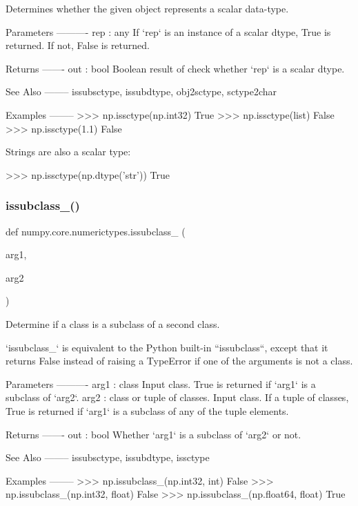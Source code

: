 \begin{DoxyVerb}Determines whether the given object represents a scalar data-type.

Parameters
----------
rep : any
    If `rep` is an instance of a scalar dtype, True is returned. If not,
    False is returned.

Returns
-------
out : bool
    Boolean result of check whether `rep` is a scalar dtype.

See Also
--------
issubsctype, issubdtype, obj2sctype, sctype2char

Examples
--------
>>> np.issctype(np.int32)
True
>>> np.issctype(list)
False
>>> np.issctype(1.1)
False

Strings are also a scalar type:

>>> np.issctype(np.dtype('str'))
True\end{DoxyVerb}
 \mbox{\label{namespacenumpy_1_1core_1_1numerictypes_aabfb2145123e09bd184960c3f238b9db}} 
\subsubsection{\texorpdfstring{issubclass\+\_\+()}{issubclass\_()}}
{\footnotesize\ttfamily def numpy.\+core.\+numerictypes.\+issubclass\+\_\+ (\begin{DoxyParamCaption}\item[{}]{arg1,  }\item[{}]{arg2 }\end{DoxyParamCaption})}

\begin{DoxyVerb}Determine if a class is a subclass of a second class.

`issubclass_` is equivalent to the Python built-in ``issubclass``,
except that it returns False instead of raising a TypeError if one
of the arguments is not a class.

Parameters
----------
arg1 : class
    Input class. True is returned if `arg1` is a subclass of `arg2`.
arg2 : class or tuple of classes.
    Input class. If a tuple of classes, True is returned if `arg1` is a
    subclass of any of the tuple elements.

Returns
-------
out : bool
    Whether `arg1` is a subclass of `arg2` or not.

See Also
--------
issubsctype, issubdtype, issctype

Examples
--------
>>> np.issubclass_(np.int32, int)
False
>>> np.issubclass_(np.int32, float)
False
>>> np.issubclass_(np.float64, float)
True\end{DoxyVerb}
 \mbox{\label{namespacenumpy_1_1core_1_1numerictypes_a42ed83d8a157a361cc678587b9c64ec3}} 
